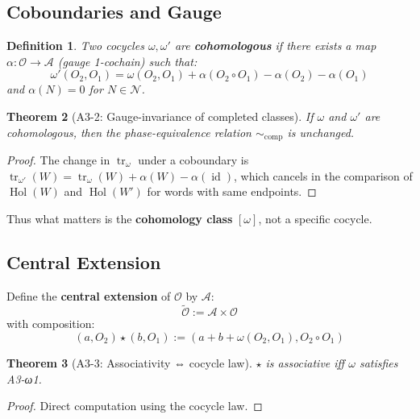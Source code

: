 \documentclass[12pt, oneside]{article}
\newtheorem{theorem}{Theorem}[section]
\newtheorem{definition}[theorem]{Definition}
\DeclareMathOperator{\id}{id}
\DeclareMathOperator{\tr}{tr}
\DeclareMathOperator{\Hol}{Hol}
\newcommand{\N}{\mathcal{N}}
\newcommand{\A}{\mathcal{A}}
\newcommand{\Opr}{\mathcal{O}}
\newcommand{\wtilde}{\widetilde}
\begin{document}
\subsection{Coboundaries and Gauge}

\begin{definition}
Two cocycles $\omega, \omega'$ are \textbf{cohomologous} if there exists a map $\alpha: \Opr \rightarrow \A$ (gauge 1-cochain) such that:
\begin{equation}
\omega'(O_2, O_1) = \omega(O_2, O_1) + \alpha(O_2 \circ O_1) - \alpha(O_2) - \alpha(O_1)
\end{equation}
and $\alpha(N) = 0$ for $N \in \N$.
\end{definition}

\begin{theorem}[A3-2: Gauge-invariance of completed classes]
If $\omega$ and $\omega'$ are cohomologous, then the phase-equivalence relation $\sim_{\text{comp}}$ is unchanged.
\end{theorem}

\begin{proof}
The change in $\tr_\omega$ under a coboundary is $\tr_{\omega'}(W) = \tr_\omega(W) + \alpha(W) - \alpha(\id)$, which cancels in the comparison of $\Hol(W)$ and $\Hol(W')$ for words with same endpoints.
\end{proof}

Thus what matters is the \textbf{cohomology class} $[\omega]$, not a specific cocycle.

\subsection{Central Extension}

Define the \textbf{central extension} of $\Opr$ by $\A$:
\begin{equation}
\wtilde{\Opr} := \A \times \Opr
\end{equation}
with composition:
\begin{equation}
(a, O_2) \star (b, O_1) := (a + b + \omega(O_2, O_1), O_2 \circ O_1)
\end{equation}

\begin{theorem}[A3-3: Associativity ⇔ cocycle law]
$\star$ is associative iff $\omega$ satisfies A3-ω1.
\end{theorem}

\begin{proof}
Direct computation using the cocycle law.
\end{proof}
\end{document}
